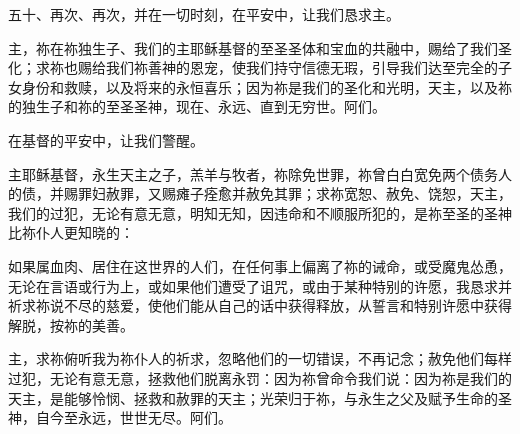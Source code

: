 \par

五十、再次、再次，并在一切时刻，在平安中，让我们恳求主。\par

\par

主，祢在祢独生子、我们的主耶稣基督的至圣圣体和宝血的共融中，赐给了我们圣化；求祢也赐给我们祢善神的恩宠，使我们持守信德无瑕，引导我们达至完全的子女身份和救赎，以及将来的永恒喜乐；因为祢是我们的圣化和光明，天主，以及祢的独生子和祢的至圣圣神，现在、永远、直到无穷世。阿们。\par

\par

在基督的平安中，让我们警醒。\par

\par

\par

\par

主耶稣基督，永生天主之子，羔羊与牧者，祢除免世罪，祢曾白白宽免两个债务人的债，并赐罪妇赦罪，又赐瘫子痊愈并赦免其罪；求祢宽恕、赦免、饶恕，天主，我们的过犯，无论有意无意，明知无知，因违命和不顺服所犯的，是祢至圣的圣神比祢仆人更知晓的：\par

如果属血肉、居住在这世界的人们，在任何事上偏离了祢的诫命，或受魔鬼怂恿，无论在言语或行为上，或如果他们遭受了诅咒，或由于某种特别的许愿，我恳求并祈求祢说不尽的慈爱，使他们能从自己的话中获得释放，从誓言和特别许愿中获得解脱，按祢的美善。\par

主，求祢俯听我为祢仆人的祈求，忽略他们的一切错误，不再记念；赦免他们每样过犯，无论有意无意，拯救他们脱离永罚：因为祢曾命令我们说：因为祢是我们的天主，是能够怜悯、拯救和赦罪的天主；光荣归于祢，与永生之父及赋予生命的圣神，自今至永远，世世无尽。阿们。\par

